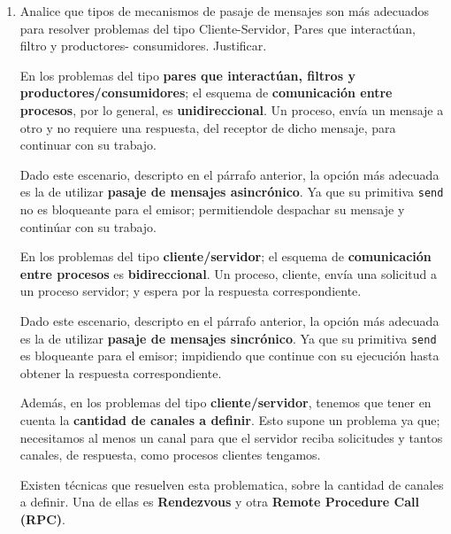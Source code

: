 \documentclass[a4paper, 10pt]{article}
\newenvironment{QandA}{
    \begin{enumerate}\bfseries}
    {\end{enumerate}
}
\newenvironment{answered}{\par\normalfont}{}
\begin{document}
\begin{QandA}

\item Analice que tipos de mecanismos de pasaje de mensajes son más adecuados para resolver problemas del tipo Cliente-Servidor, Pares que interactúan, filtro y productores- consumidores. Justificar.

\begin{answered}
En los problemas del tipo \textbf{pares que interactúan, filtros y productores/consumidores}; el esquema de \textbf{comunicación entre procesos}, por lo general, es \textbf{unidireccional}. Un proceso, envía un mensaje a otro y no requiere una respuesta, del receptor de dicho mensaje, para continuar con su trabajo.

Dado este escenario, descripto en el párrafo anterior, la opción más adecuada es la de utilizar \textbf{pasaje de mensajes asincrónico}. Ya que su primitiva \lstinline{send} no es bloqueante para el emisor; permitiendole despachar su mensaje y continúar con su trabajo.

En los problemas del tipo \textbf{cliente/servidor}; el esquema de \textbf{comunicación entre procesos} es \textbf{bidireccional}. Un proceso, cliente, envía una solicitud a un proceso servidor; y espera por la respuesta correspondiente.

Dado este escenario, descripto en el párrafo anterior, la opción más adecuada es la de utilizar \textbf{pasaje de mensajes sincrónico}. Ya que su primitiva \lstinline{send} es bloqueante para el emisor; impidiendo que continue con su ejecución hasta obtener la respuesta correspondiente.

Además, en los problemas del tipo \textbf{cliente/servidor}, tenemos que tener en cuenta la \textbf{cantidad de canales a definir}. Esto supone un problema ya que; necesitamos al menos un canal para que el servidor reciba solicitudes y tantos canales, de respuesta, como procesos clientes tengamos. 

Existen técnicas que resuelven esta problematica, sobre la cantidad de canales a definir. Una de ellas es \textbf{Rendezvous} y otra \textbf{Remote Procedure Call (RPC)}.
\end{answered}
\end{QandA}
\end{document}
